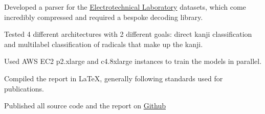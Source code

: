\documentclass[]{cv-roald}
\begin{document}
\begin{tabularcv}
\begin{tabitemize}
        \item Developed a parser for the \href{http://etlcdb.db.aist.go.jp/}{Electrotechnical Laboratory} datasets, which come incredibly compressed and required a bespoke decoding library.
        \item Tested 4 different architectures with 2 different goals: direct kanji classification and multilabel classification of radicals that make up the kanji.
        \item Used AWS EC2 p2.xlarge and c4.8xlarge instances to train the models in parallel.
        \item Compiled the report in \LaTeX, generally following standards used for publications.
        \item Published all source code and the report on \href{https://github.com/balayanr/kanji_recognition_412}{Github}
    \end{tabitemize}\\[\vspacepar]
\end{tabularcv}
\end{document}
